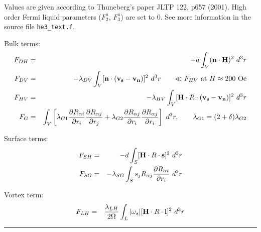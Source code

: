 \documentclass[a4paper]{article}
\begin{document}
Values are given according to Thuneberg's paper JLTP 122, p657 (2001).
High order Fermi liquid parameters ($F_2^a$, $F_3^a$) are set to 0.
See more information in the source file {\tt he3\_text.f}.

Bulk terms:
\begin{eqnarray*}
F_{DH} &=& -a
  \int_V ({\bf n} \cdot {\bf H})^2\ d^3r\\
F_{DV} &=& -\lambda_{DV}
  \int_V [{\bf n} \cdot ({\bf v_s}-{\bf v_n}) ]^2\ d^3r
\qquad {\ll F_{HV} \mbox{~at~} H\approx 200 \mbox{~Oe}}\\
F_{HV} &=& -\lambda_{HV}
  \int_V [{\bf H} \cdot R \cdot ({\bf v_s}-{\bf v_n}) ]^2\ d^3r\\
F_{G}  &=& \int_V \left[
  \lambda_{G1}\frac{\partial R_{\alpha i}}{\partial r_i}
              \frac{\partial R_{\alpha j}}{\partial r_j} +
  \lambda_{G2}\frac{\partial R_{\alpha j}}{\partial r_i}
              \frac{\partial R_{\alpha j}}{\partial r_i}
  \right]\ d^3r,\qquad \lambda_{G1}=(2+\delta)\lambda_{G2}\\
\end{eqnarray*}

Surface terms:
\begin{eqnarray*}
F_{SH} &=& -d
  \int_S [{\bf H} \cdot R \cdot {\bf s} ]^2\ d^2r\\
F_{SG} &=& -\lambda_{SG}
  \int_S s_j R_{\alpha j}
    \frac{\partial R_{\alpha i}}{\partial r_i}\ d^2r\\
\end{eqnarray*}

Vortex term:
\begin{eqnarray*}
F_{LH} &=& \frac{\lambda_{LH}}{2\Omega}
  \int_L |\omega_s| [{\bf H} \cdot R \cdot {\bf l} ]^2\ d^3r\\
\end{eqnarray*}

\hrule
\end{document}
